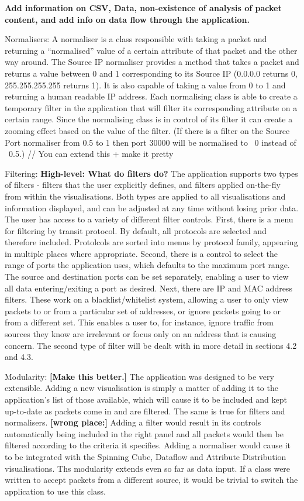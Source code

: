 \textbf{Add information on CSV, Data, non-existence of analysis of packet content, and add info on data flow through the application.}

Normalisers:
A normaliser is a class responsible with taking a packet and returning a ``normalised'' value of a certain attribute of that packet and the other way around. The Source IP normaliser provides a method that takes a packet and returns a value between 0 and 1 corresponding to its Source IP (0.0.0.0 returns 0, 255.255.255.255 returns 1). It is also capable of taking a value from 0 to 1 and returning a human readable IP address. 
Each normalising class is able to create a temporary filter in the application that will filter its corresponding attribute on a certain range. 
Since the normalising class is in control of its filter it can create a zooming effect based on the value of the filter. 
(If there is a filter on the Source Port normaliser from 0.5 to 1 then port 30000 will be normalised to ~0 instead of ~0.5.)
// You can extend this + make it pretty

Filtering:
\textbf{High-level: What do filters do?}
The application supports two types of filters - filters that the user explicitly defines, and filters applied on-the-fly from within the visualisations.
Both types are applied to all visualisations and information displayed, and can be adjusted at any time without losing prior data.
The user has access to a variety of different filter controls.  First, there is a menu for filtering by transit protocol. By default, all protocols are selected and therefore included. Protolcols are sorted into menus by protocol family, appearing in multiple places where appropriate. Second, there is a control to select the range of ports the application uses, which defaults to the maximum port range.  The source and destination ports can be set separately, enabling a user to view all data entering/exiting a port as desired.  Next, there are IP and MAC address filters.  These work on a blacklist/whitelist system, allowing a user to only view packets to or from a particular set of addresses, or ignore packets going to or from a different set.  This enables a user to, for instance, ignore traffic from sources they know are irrelevant or focus only on an address that is causing concern.
The second type of filter will be dealt with in more detail in sections 4.2 and 4.3.

Modularity: \textbf{[Make this better.]}
The application was designed to be very extensible.  Adding a new visualisation is simply a matter of adding it to the application's list of those available, which will cause it to be included and kept up-to-date as packets come in and are filtered.  The same is true for filters and normalisers.  \textbf{[wrong place:] }Adding a filter would result in its controls automatically being included in the right panel and all packets would then be filtered according to the criteria it specifies.  Adding a normaliser would cause it to be integrated with the Spinning Cube, Dataflow and Attribute Distribution visualisations.  Ths modularity extends even so far as data input.  If a class were written to accept packets from a different source, it would be trivial to switch the application to use this class.